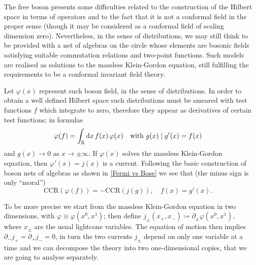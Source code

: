  \bigskip 
 The free boson presents some difficulties related to the 
 construction of the Hilbert space in terms of operators and
 to the fact that it is not a conformal field in the proper
 sense (though it may be considered as a conformal field of
 scaling dimension zero). Nevertheless, in the sense of
 distributions, we may still think to be provided with a net
 of algebras on the circle whose elements are bosonic fields
 satisfying suitable commutation relations and two-point 
 functions. Such models are realised as solutions to the
 massless Klein-Gordon equation, still fulfilling the 
 requirements to be a conformal invariant field theory. 
 
 Let $\varphi(x)$ represent such boson field, in the sense
 of distributions. In order to obtain a well defined Hilbert 
 space such distributions must be smeared with test functions
 $f$ which integrate to zero, therefore they appear as 
 derivatives of certain test functions; in formulae
 \[
 \varphi(f)=\int_{\mathbb{R}}\textrm{d} x\,f(x)\,\varphi(x)\quad
 \textrm{with }g(x)\mid g'(x)=f(x)
 \]
 and $g(x)\to 0$ as $x\to \pm \infty$.
 If $\varphi(x)$ solves the massless Klein-Gordon equation,
 then $\varphi'(x)=j(x)$ is a current. Following the basic 
 construction of boson nets of algebras as shown in 
 \ref{Fermi vs Bose} we see that (the minus sign is only 
 ``moral'')
 \[
 \text{CCR}(\varphi(f))=-\text{CCR}(j(g)),\quad f(x)=g'(x).
 \]

 \bigskip
 To be more precise we start from the massless Klein-Gordon 
 equation in two dimensions, with $\varphi\equiv\varphi(x^0,x^1)$;
 then define $j_{\pm}(x_+,x_-)\coloneqq\partial_{\pm}\varphi(x^0,x^1)$,
 where $x_{\pm}$ are the usual lightcone variables. The 
 equation of motion then implies $\partial_-j_+=
 \partial_+j_-=0$, in turn the two currents 
 $j_{\pm}$ depend on only one variable at a time 
 and we can decompose the theory into
 two one-dimensional copies, that we 
 are going to analyse separately.
 
